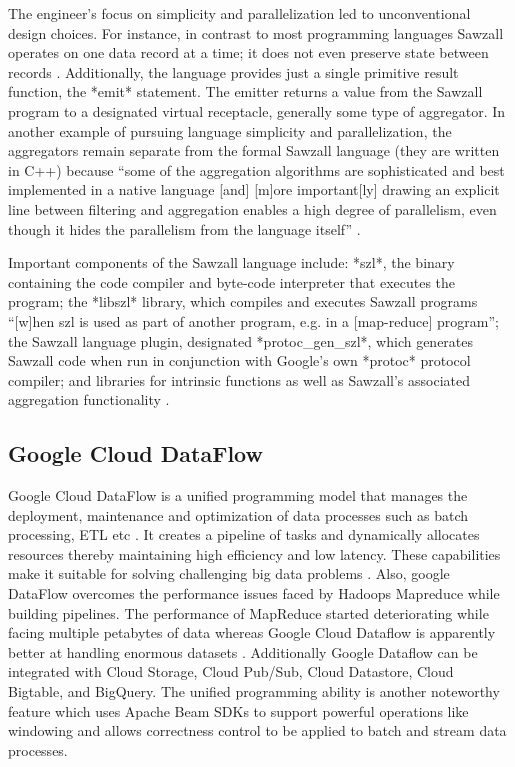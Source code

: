      The engineer's focus on simplicity and parallelization led to
     unconventional design choices.  For instance, in contrast to most
     programming languages Sawzall operates on one data record at a
     time; it does not even preserve state between records
     \cite{www-bytemining-sawzall}. Additionally, the language provides
     just a single primitive result function, the *emit* statement.
     The emitter returns a value from the Sawzall program to a
     designated virtual receptacle, generally some type of aggregator.
     In another example of pursuing language simplicity and
     parallelization, the aggregators remain separate from the formal
     Sawzall language (they are written in C++) because ``some of the
     aggregation algorithms are sophisticated and best implemented in
     a native language [and] [m]ore important[ly] drawing an explicit
     line between filtering and aggregation enables a high degree of
     parallelism, even though it hides the parallelism from the
     language itself'' \cite{pike05sawzall}.

     Important components of the Sawzall language include: *szl*, the
     binary containing the code compiler and byte-code interpreter
     that executes the program; the *libszl* library, which compiles
     and executes Sawzall programs ``[w]hen szl is used as part of
     another program, e.g. in a [map-reduce] program''; the Sawzall
     language plugin, designated *protoc\_gen\_szl*, which generates
     Sawzall code when run in conjunction with Google's own *protoc*
     protocol compiler; and libraries for intrinsic functions as well
     as Sawzall's associated aggregation functionality
     \cite{www-google-code-wiki-sawzall}.

     \pv

\subsection{Google Cloud DataFlow}
     
     Google Cloud DataFlow is a unified
     programming model that manages the deployment, maintenance and
     optimization of data processes such as batch processing, ETL
     etc \cite{www-cloud-google1}. It creates a pipeline of tasks and dynamically allocates
     resources thereby maintaining high efficiency and low
     latency. These capabilities make it suitable for solving challenging big data
     problems \cite{www-cloud-google1}. Also, google DataFlow overcomes the performance issues
     faced by Hadoops Mapreduce while building pipelines\cite{www-dataconomy}.
     The performance of MapReduce started
     deteriorating while facing multiple petabytes of data whereas
     Google Cloud Dataflow is apparently better at handling enormous
     datasets \cite{www-cloud-google1}. Additionally Google Dataflow
     can be integrated with Cloud Storage, Cloud Pub/Sub, Cloud
     Datastore, Cloud Bigtable, and BigQuery. The unified programming
     ability is another noteworthy feature which uses Apache Beam SDKs
     to support powerful operations like windowing and allows
     correctness control to be applied to batch and stream data
     processes.

